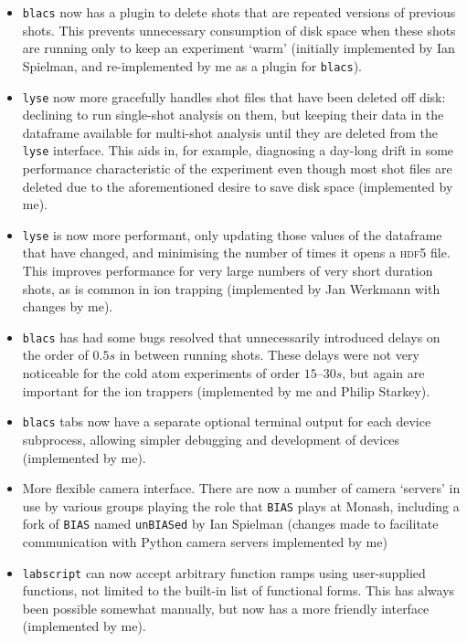 \begin{itemize}
    \item \texttt{blacs} now has a plugin to delete shots that are repeated versions of previous shots. This prevents unnecessary consumption of disk space when these shots are running only to keep an experiment `warm' (initially implemented by Ian Spielman, and re-implemented by me as a plugin for \texttt{blacs}).
    
    \item \texttt{lyse} now more gracefully handles shot files that have been deleted off disk: declining to run single-shot analysis on them, but keeping their data in the dataframe available for multi-shot analysis until they are deleted from the \texttt{lyse} interface. This aids in, for example, diagnosing a day-long drift in some performance characteristic of the experiment even though most shot files are deleted due to the aforementioned desire to save disk space (implemented by me).
    
    \item \texttt{lyse} is now more performant, only updating those values of the dataframe that have changed, and minimising the number of times it opens a \textsc{hdf5} file. This improves performance for very large numbers of very short duration shots, as is common in ion trapping (implemented by Jan Werkmann with changes by me).
    
    \item \texttt{blacs} has had some bugs resolved that unnecessarily introduced delays on the order of $0.5\unit{s}$ in between running shots. These delays were not very noticeable for the cold atom experiments of order $15\textrm{--}30\unit{s}$, but again are important for the ion trappers (implemented by me and Philip Starkey).
    
    \item \texttt{blacs} tabs now have a separate optional terminal output for each device subprocess, allowing simpler debugging and development of devices (implemented by me).
    
    \item More flexible camera interface. There are now a number of camera `servers' in use by various groups playing the role that \texttt{BIAS} plays at Monash, including a fork of \texttt{BIAS} named \texttt{unBIASed} by Ian Spielman (changes made to facilitate communication with Python camera servers implemented by me)
    
    \item \texttt{labscript} can now accept arbitrary function ramps using user-supplied functions, not limited to the built-in list of functional forms. This has always been possible somewhat manually, but now has a more friendly interface (implemented by me).
    

\end{itemize}
